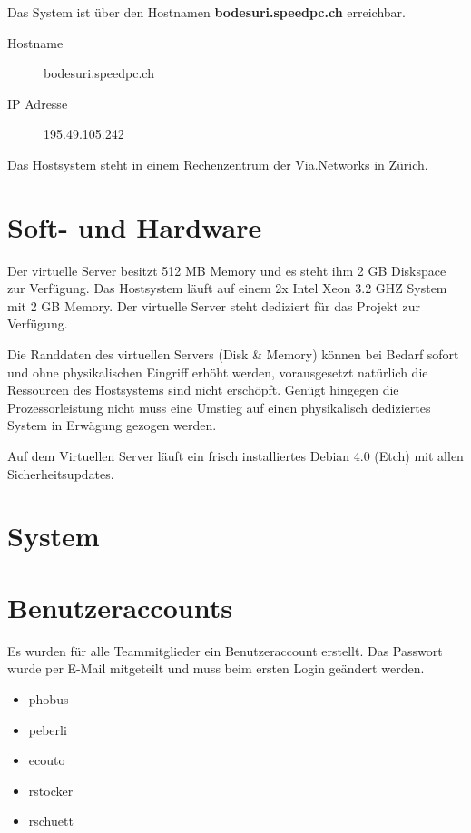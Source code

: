 \documentclass[a4paper,12pt,halfparskip,DIV14]{scrreprt}
\begin{document}
Das System ist über den Hostnamen \textbf{bodesuri.speedpc.ch} erreichbar. 

\begin{description}
  \item[Hostname] bodesuri.speedpc.ch
  \item[IP Adresse] 195.49.105.242
\end{description}

Das Hostsystem steht in einem Rechenzentrum der Via.Networks in Zürich.


\section{Soft- und Hardware} %
\label{sec:soft_und_hardware}

Der virtuelle Server besitzt 512 MB Memory und es steht ihm 2 GB Diskspace zur Verfügung. Das Hostsystem läuft auf einem 2x Intel Xeon 3.2 GHZ System mit 2 GB Memory. Der virtuelle Server steht dediziert für das Projekt zur Verfügung.

Die Randdaten des virtuellen Servers (Disk \& Memory) können bei Bedarf sofort und ohne physikalischen Eingriff erhöht werden, vorausgesetzt natürlich die Ressourcen des Hostsystems sind nicht erschöpft. Genügt hingegen die Prozessorleistung nicht muss eine Umstieg auf einen physikalisch dediziertes System in Erwägung gezogen werden.

Auf dem Virtuellen Server läuft ein frisch installiertes Debian 4.0 (Etch) mit allen Sicherheitsupdates.


\section{System} %
\label{sec:system}


\section{Benutzeraccounts} %
\label{sec:benutzeraccounts}

Es wurden für alle Teammitglieder ein Benutzeraccount erstellt. Das Passwort wurde per E-Mail mitgeteilt und muss beim ersten Login geändert werden.

\begin{itemize}
  \item phobus
  \item peberli
  \item ecouto
  \item rstocker
  \item rschuett
\end{itemize}
\end{document}
